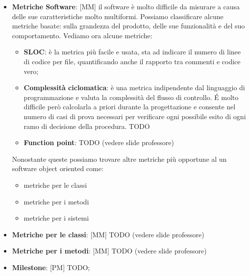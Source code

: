 \begin{itemize}
	\item \textbf{Metriche Software}: [MM] il software è molto difficile da misurare a causa delle sue caratteristiche molto multiformi. Possiamo classificare alcune metriche basate: sulla grandezza del prodotto, delle sue funzionalità e del suo comportamento. Vediamo ora alcune metriche:
		\begin{itemize}
			\item \textbf{SLOC}: è la metrica più facile e usata, sta ad indicare il numero di linee di codice per file, quantificando anche il rapporto tra commenti e codice vero;
			\item \textbf{Complessità ciclomatica}: è una metrica indipendente dal linguaggio di programmazione e valuta la complessità del flusso di controllo. \'E molto difficile però calcolarla a priori durante la progettazione e consente nel numero  di casi di prova necessari per verificare ogni possibile esito di ogni ramo di decisione della procedura. TODO


			\item \textbf{Function point}: TODO (vedere slide professore)

		\end{itemize}
		\noindent
		Nonostante queste possiamo trovare altre metriche più opportune al un software object oriented come:
		\begin{itemize}
			\item metriche per le classi
			\item metriche per i metodi
			\item metriche per i sistemi
		\end{itemize}


	\item \textbf{Metriche per le classi}: [MM] TODO (vedere slide professore)

	\item \textbf{Metriche per i metodi}: [MM] TODO (vedere slide professore)


	\item \textbf{Milestone}: [PM] TODO;


\end{itemize}
